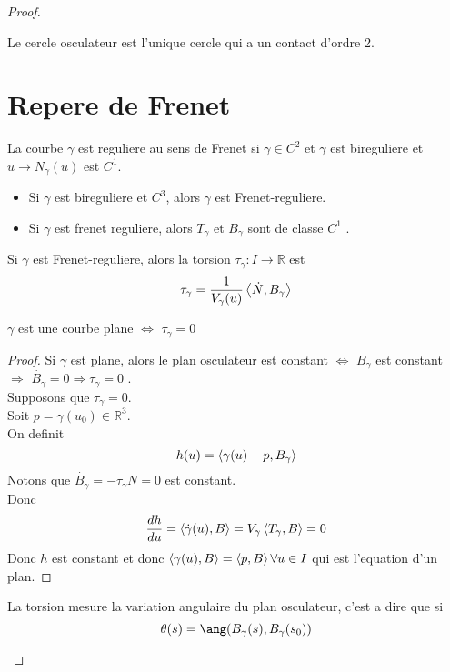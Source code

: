 \documentclass[../main.tex]{subfiles}
\begin{document}
\begin{proof}
\begin{defn}
\end{defn}
\begin{propo}
Le cercle osculateur est l'unique cercle qui a un contact d'ordre 2.
\end{propo}
\section{Repere de Frenet}
\begin{defn}
	La courbe $\gamma$ est reguliere au sens de Frenet si $\gamma \in C^{2}$ et $\gamma$ est bireguliere et $u \to N_{\gamma} ( u) $ est $C^{1}$.
\end{defn}
\begin{rmq}
	\begin{itemize}
	\item Si $\gamma$ est bireguliere et $C^{3}$, alors $\gamma$ est Frenet-reguliere.

	\item Si $\gamma$ est frenet reguliere, alors $T_{\gamma} $ et $B_\gamma$ sont de classe $C^{1}$ .		
	\end{itemize}
	
\end{rmq}
Si $\gamma$ est Frenet-reguliere, alors la torsion $\tau_{\gamma} : I \to \mathbb{R}$ est
\[ 
	\tau_{\gamma} = \frac{1}{V_{\gamma} ( u) }\left\langle \dot N, B_{\gamma} \right\rangle 
\]
\begin{propo}
$\gamma$ est une courbe plane $\iff$ $\tau_{\gamma} =0$ 
\end{propo}
\begin{proof}
Si $\gamma$ est plane, alors le plan osculateur est constant $\iff$  $B_{\gamma} $ est constant $\Rightarrow$ $\dot { B_{\gamma} } =0 \Rightarrow \tau_{\gamma} =0$ .\\
Supposons que $\tau_{\gamma} =0$.\\
Soit $p=\gamma( u_0) \in \mathbb{R}^{3}$.\\
On definit
\[ 
	h( u) = \left\langle \gamma( u) -p, B_{\gamma} \right\rangle 
\]
Notons que $\dot { B_{\gamma} }= - \tau_{\gamma} N =0 $ est constant.\\
Donc
\[ 
	\frac{dh}{du}= \left\langle\dot { \gamma} ( u) , B\right\rangle = V_{\gamma} \left\langle T_{\gamma} , B\right\rangle =0
\]
Donc $h$ est constant et donc $\left\langle \gamma( u) , B\right\rangle = \left\langle p,B\right\rangle \forall u \in I$ qui est l'equation d'un plan.	
\end{proof}
\begin{propo}
La torsion mesure la variation angulaire du plan osculateur, c'est a dire que si 
\[ 
	\theta( s) =\ang ( B_{\gamma} ( s) ,B_{\gamma } ( s_0) ) 
\]


\end{propo}
\end{proof}
\end{document}
